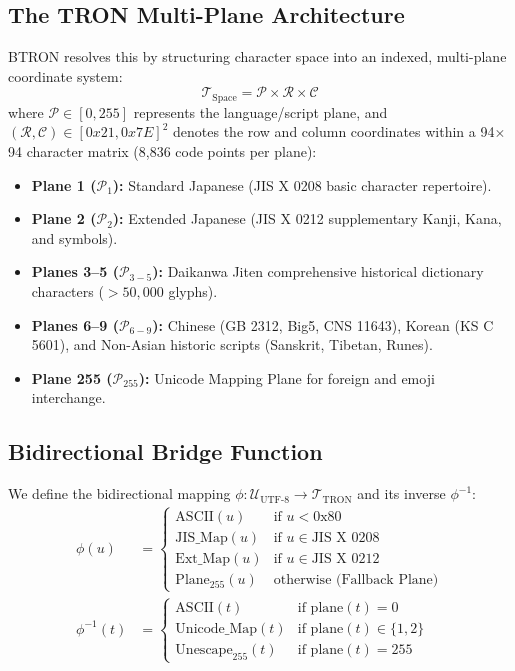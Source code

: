 \documentclass[10pt,journal,compsoc,twocolumn]{article}
\begin{document}
\subsection{The TRON Multi-Plane Architecture}
BTRON resolves this by structuring character space into an indexed, multi-plane coordinate system:
\begin{equation}
\mathcal{T}_{\text{Space}} = \mathcal{P} \times \mathcal{R} \times \mathcal{C}
\end{equation}
where $\mathcal{P} \in [0, 255]$ represents the language/script plane, and $(\mathcal{R}, \mathcal{C}) \in [0x21, 0x7E]^2$ denotes the row and column coordinates within a 94$\times$94 character matrix (8,836 code points per plane):
\begin{itemize}[leftmargin=*]
    \item \textbf{Plane 1 ($\mathcal{P}_1$):} Standard Japanese (JIS X 0208 basic character repertoire).
    \item \textbf{Plane 2 ($\mathcal{P}_2$):} Extended Japanese (JIS X 0212 supplementary Kanji, Kana, and symbols).
    \item \textbf{Planes 3--5 ($\mathcal{P}_{3-5}$):} Daikanwa Jiten comprehensive historical dictionary characters ($>50,000$ glyphs).
    \item \textbf{Planes 6--9 ($\mathcal{P}_{6-9}$):} Chinese (GB 2312, Big5, CNS 11643), Korean (KS C 5601), and Non-Asian historic scripts (Sanskrit, Tibetan, Runes).
    \item \textbf{Plane 255 ($\mathcal{P}_{255}$):} Unicode Mapping Plane for foreign and emoji interchange.
\end{itemize}

\subsection{Bidirectional Bridge Function}
We define the bidirectional mapping $\phi: \mathcal{U}_{\text{UTF-8}} \to \mathcal{T}_{\text{TRON}}$ and its inverse $\phi^{-1}$:
\begin{align}
\phi(u) &= \begin{cases} 
\text{ASCII}(u) & \text{if } u < 0\text{x}80 \\
\text{JIS\_Map}(u) & \text{if } u \in \text{JIS X 0208} \\
\text{Ext\_Map}(u) & \text{if } u \in \text{JIS X 0212} \\
\text{Plane}_{255}(u) & \text{otherwise (Fallback Plane)}
\end{cases} \\
\phi^{-1}(t) &= \begin{cases}
\text{ASCII}(t) & \text{if } \text{plane}(t) = 0 \\
\text{Unicode\_Map}(t) & \text{if } \text{plane}(t) \in \{1, 2\} \\
\text{Unescape}_{255}(t) & \text{if } \text{plane}(t) = 255
\end{cases}
\end{align}
\end{document}
